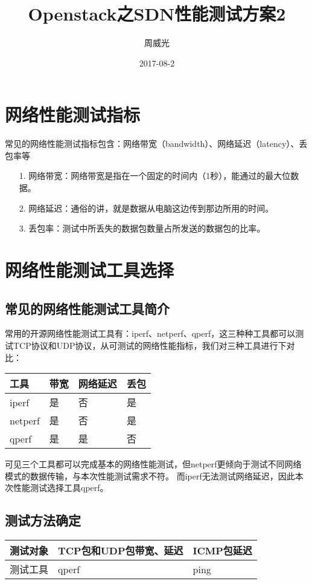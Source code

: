 \documentclass[a4paper,left=1.5cm,right=1.5cm,11pt]{article}
\title{Openstack之SDN性能测试方案2}
\author{周威光}
\date{2017-08-2}
\begin{document}
\maketitle
\clearpage
\tableofcontents
\clearpage
\section{网络性能测试指标}
常见的网络性能测试指标包含：网络带宽（bandwidth）、网络延迟（latency）、丢包率等
\begin{itemize}
	\item[1.]网络带宽：网络带宽是指在一个固定的时间内（1秒），能通过的最大位数据。
	\item[2.]网络延迟：通俗的讲，就是数据从电脑这边传到那边所用的时间。
	\item[3.]丢包率：测试中所丢失的数据包数量占所发送的数据包的比率。
\end{itemize}

\section{网络性能测试工具选择}
\subsection{常见的网络性能测试工具简介}
常用的开源网络性能测试工具有：iperf、netperf、qperf，这三种种工具都可以测试TCP协议和UDP协议，从可测试的网络性能指标，我们对三种工具进行下对比：
\begin{center}
\begin{tabular}[c]{|l|l|l|l|}
\hline
工具 & 带宽 & 网络延迟 & 丢包 \\
\hline
iperf & 是 & 否 & 是 \\
\hline
netperf & 是 & 否 & 是 \\
\hline
qperf & 是 & 是 & 否 \\
\hline
\end{tabular}
\end{center}\par
可见三个工具都可以完成基本的网络性能测试，但netperf更倾向于测试不同网络模式的数据传输，与本次性能测试需求不符。
而iperf无法测试网络延迟，因此本次性能测试选择工具qperf。
\subsection{测试方法确定}
\begin{center}
\begin{tabular}[c]{|l|l|l|}
\hline
测试对象 & TCP包和UDP包带宽、延迟 & ICMP包延迟  \\
\hline
测试工具 & qperf & ping \\
\hline
\end{tabular}
\end{center}
\end{document}

